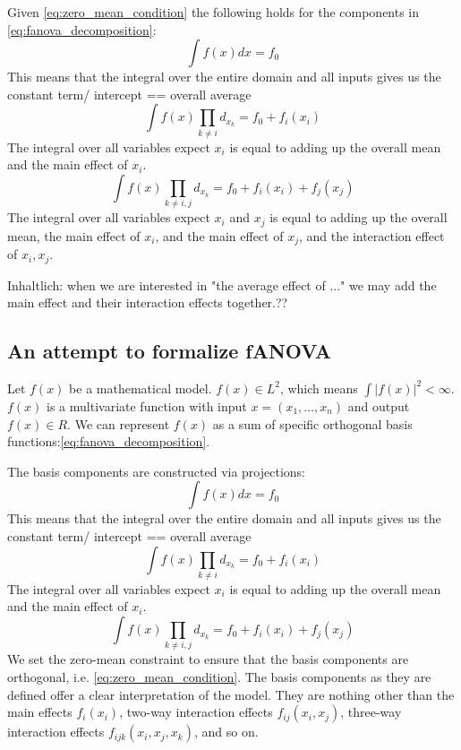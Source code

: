 Given \autoref{eq:zero_mean_condition} the following holds for the components in \autoref{eq:fanova_decomposition}:
\begin{equation}
    \int f(x) dx = f_0
\end{equation}
This means that the integral over the entire domain and all inputs gives us the constant term/ intercept == overall average
\begin{equation}
    \int f(x) \prod_{k \neq i} d_{x_{k}} = f_0 + f_i(x_i)
\end{equation}
The integral over all variables expect $x_i$ is equal to adding up the overall mean and the main effect of $x_i$.
\begin{equation}
    \int f(x) \prod_{k \neq i,j} d_{x_{k}} = f_0 + f_i(x_i) + f_j(x_j)
\end{equation}
The integral over all variables expect $x_i$ and $x_j$ is equal to adding up the overall mean, the main effect of $x_i$, and the main effect of $x_j$, and the interaction effect of $x_i, x_j$.\par
Inhaltlich: when we are interested in "the average effect of ..." we may add the main effect and their interaction effects together.??


\subsection*{An attempt to formalize fANOVA}
Let $f(x)$ be a mathematical model. $f(x) \in L^2$, which means $\int|f(x)|^2 < \infty$. $f(x)$ is a multivariate function with input $x = (x_1,\dots, x_n)$ and output $f(x) \in R$. We can represent $f(x)$ as a sum of specific orthogonal basis functions:\autoref{eq:fanova_decomposition}.\par
The basis components are constructed via projections:
\begin{equation}
    \int f(x) dx = f_0
\end{equation}
This means that the integral over the entire domain and all inputs gives us the constant term/ intercept == overall average
\begin{equation}
    \int f(x) \prod_{k \neq i} d_{x_{k}} = f_0 + f_i(x_i)
\end{equation}
The integral over all variables expect $x_i$ is equal to adding up the overall mean and the main effect of $x_i$.
\begin{equation}
    \int f(x) \prod_{k \neq i,j} d_{x_{k}} = f_0 + f_i(x_i) + f_j(x_j)
\end{equation}
We set the zero-mean constraint to ensure that the basis components are orthogonal, i.e. \autoref{eq:zero_mean_condition}.
The basis components as they are defined offer a clear interpretation of the model. They are nothing other than the main effects $f_i(x_i)$, two-way interaction effects $f_{ij}(x_i,x_j)$, three-way interaction effects $f_{ijk}(x_i,x_j,x_k)$, and so on.


